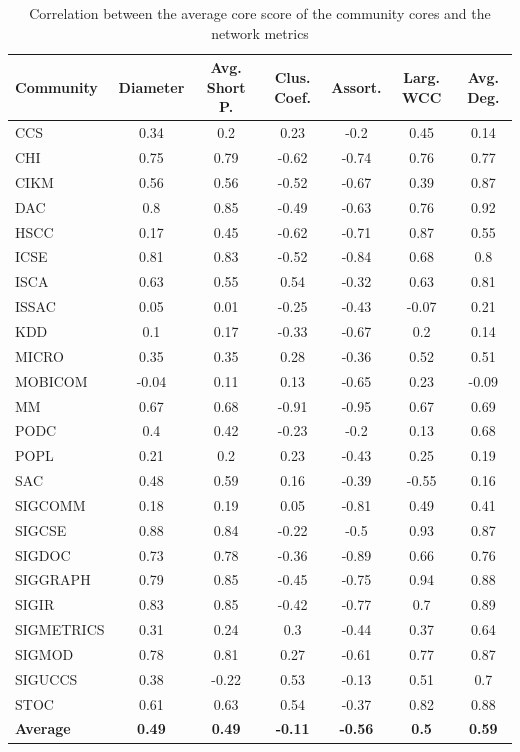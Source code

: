 \documentclass[letterpaper]{www13-companion-accepted}
\begin{document}
\begin{table}[!htbp]
\centering
\caption{Correlation between the average core score of the community cores and the network metrics}
\label{tab:correlation_metrics}
{\small
\begin{tabular}{|l|c|c|c|c|c|c|} \hline
\bf Community & \bf Diameter & \bf Avg. Short P. & \bf Clus. Coef. & \bf Assort. & \bf Larg. WCC & \bf Avg. Deg. \\ \hline
CCS & 0.34 & 0.2 & 0.23 & -0.2 & 0.45 & 0.14 \\ \hline
CHI & 0.75 & 0.79 & -0.62 & -0.74 & 0.76 & 0.77 \\ \hline
CIKM & 0.56 & 0.56 & -0.52 & -0.67 & 0.39 & 0.87 \\ \hline
DAC & 0.8 & 0.85 & -0.49 & -0.63 & 0.76 & 0.92 \\ \hline
HSCC & 0.17 & 0.45 & -0.62 & -0.71 & 0.87 & 0.55 \\ \hline
ICSE & 0.81 & 0.83 & -0.52 & -0.84 & 0.68 & 0.8 \\ \hline
ISCA & 0.63 & 0.55 & 0.54 & -0.32 & 0.63 & 0.81  \\ \hline
ISSAC & 0.05 & 0.01 & -0.25 & -0.43 & -0.07 & 0.21 \\ \hline
KDD & 0.1 & 0.17 & -0.33 & -0.67 & 0.2 & 0.14\\ \hline
MICRO & 0.35 & 0.35 & 0.28 & -0.36 & 0.52 & 0.51 \\ \hline
MOBICOM & -0.04 & 0.11 & 0.13 & -0.65 & 0.23 & -0.09 \\ \hline
MM & 0.67 & 0.68 & -0.91 & -0.95 & 0.67 & 0.69 \\ \hline
PODC & 0.4 & 0.42 & -0.23 & -0.2 & 0.13 & 0.68 \\ \hline
POPL & 0.21 & 0.2 & 0.23 & -0.43 & 0.25 & 0.19 \\ \hline
SAC & 0.48 & 0.59 & 0.16 & -0.39 & -0.55 & 0.16 \\ \hline
SIGCOMM & 0.18 & 0.19 & 0.05 & -0.81 & 0.49 & 0.41\\ \hline
SIGCSE & 0.88 & 0.84 & -0.22 & -0.5 & 0.93 & 0.87 \\ \hline
SIGDOC & 0.73 & 0.78 & -0.36 & -0.89 & 0.66 & 0.76 \\ \hline
SIGGRAPH & 0.79 & 0.85 & -0.45 & -0.75 & 0.94 & 0.88 \\ \hline
SIGIR & 0.83 & 0.85 & -0.42 & -0.77 & 0.7 & 0.89 \\ \hline
SIGMETRICS & 0.31 & 0.24 & 0.3 & -0.44 & 0.37 & 0.64 \\ \hline
SIGMOD & 0.78 & 0.81 & 0.27 & -0.61 & 0.77 & 0.87 \\ \hline
SIGUCCS & 0.38 & -0.22 & 0.53 & -0.13 & 0.51 & 0.7 \\ \hline
STOC & 0.61 & 0.63 & 0.54 & -0.37 & 0.82 & 0.88\\ \hline \hline
{\bf Average} & {\bf 0.49} & {\bf 0.49} & {\bf -0.11} & {\bf -0.56} & {\bf 0.5} & {\bf 0.59} \\ \hline
\end{tabular}
}
\end{table}
\end{document}
